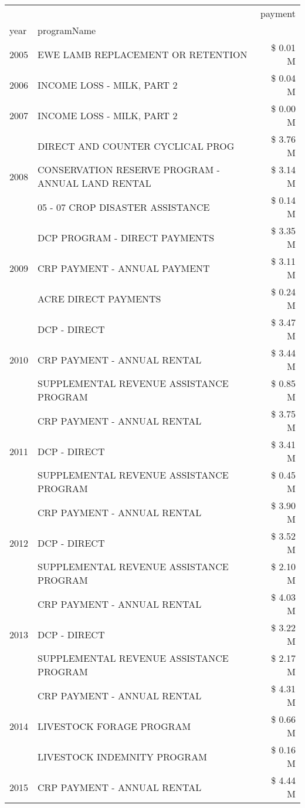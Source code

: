 \begin{tabular}{llr}
\toprule
 &  & payment \\
year & programName &  \\
\midrule
2005 & EWE LAMB REPLACEMENT OR RETENTION & \$ 0.01 M \\
\cline{1-3}
2006 & INCOME LOSS - MILK, PART 2 & \$ 0.04 M \\
\cline{1-3}
2007 & INCOME LOSS - MILK, PART 2 & \$ 0.00 M \\
\cline{1-3}
\multirow[t]{3}{*}{2008} & DIRECT AND COUNTER CYCLICAL PROG & \$ 3.76 M \\
 & CONSERVATION RESERVE PROGRAM - ANNUAL LAND RENTAL & \$ 3.14 M \\
 & 05 - 07 CROP DISASTER ASSISTANCE & \$ 0.14 M \\
\cline{1-3}
\multirow[t]{3}{*}{2009} & DCP PROGRAM - DIRECT PAYMENTS & \$ 3.35 M \\
 & CRP PAYMENT - ANNUAL PAYMENT & \$ 3.11 M \\
 & ACRE DIRECT PAYMENTS & \$ 0.24 M \\
\cline{1-3}
\multirow[t]{3}{*}{2010} & DCP - DIRECT & \$ 3.47 M \\
 & CRP PAYMENT - ANNUAL RENTAL & \$ 3.44 M \\
 & SUPPLEMENTAL REVENUE ASSISTANCE PROGRAM & \$ 0.85 M \\
\cline{1-3}
\multirow[t]{3}{*}{2011} & CRP PAYMENT - ANNUAL RENTAL & \$ 3.75 M \\
 & DCP - DIRECT & \$ 3.41 M \\
 & SUPPLEMENTAL REVENUE ASSISTANCE PROGRAM & \$ 0.45 M \\
\cline{1-3}
\multirow[t]{3}{*}{2012} & CRP PAYMENT - ANNUAL RENTAL & \$ 3.90 M \\
 & DCP - DIRECT & \$ 3.52 M \\
 & SUPPLEMENTAL REVENUE ASSISTANCE PROGRAM & \$ 2.10 M \\
\cline{1-3}
\multirow[t]{3}{*}{2013} & CRP PAYMENT - ANNUAL RENTAL & \$ 4.03 M \\
 & DCP - DIRECT & \$ 3.22 M \\
 & SUPPLEMENTAL REVENUE ASSISTANCE PROGRAM & \$ 2.17 M \\
\cline{1-3}
\multirow[t]{3}{*}{2014} & CRP PAYMENT - ANNUAL RENTAL & \$ 4.31 M \\
 & LIVESTOCK FORAGE PROGRAM & \$ 0.66 M \\
 & LIVESTOCK INDEMNITY PROGRAM & \$ 0.16 M \\
\cline{1-3}
\multirow[t]{3}{*}{2015} & CRP PAYMENT - ANNUAL RENTAL & \$ 4.44 M \\

\end{tabular}
